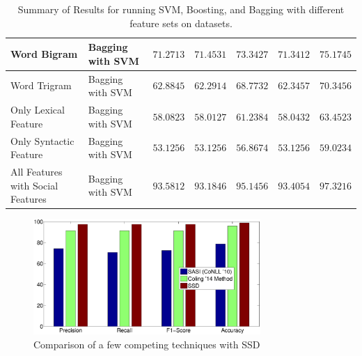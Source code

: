 \begin{table}[htb]
{\begin{tabular}{|@{~}l@{~~}|@{~~}l@{~}|@{~~}l@{~}|@{~~}l@{~}|@{~~}l@{~}|@{~~}l@{~}|@{~~}l@{~}|}
Word Bigram & Bagging with SVM & $71.2713$ & $71.4531$ & $73.3427$ & $71.3412$  & $75.1745$ \\\hline
Word Trigram & Bagging with SVM & $62.8845$ & $62.2914$ & $68.7732$ & $62.3457$ & $70.3456$ \\\hline
Only Lexical Feature & Bagging with SVM  & $58.0823$ & $58.0127$ & $61.2384$ & $58.0432$  & $63.4523$  \\\hline
Only Syntactic Feature & Bagging with SVM  & $53.1256$ & $53.1256$ & $56.8674$ & $53.1256$  & $59.0234$ \\\hline
All Features with Social Features & Bagging with SVM & $\mathbf{93.5812}$ & $\mathbf{93.1846}$ & $\mathbf{95.1456}$ & $\mathbf{93.4054}$  & $\mathbf{97.3216}$ \\\hline
\end{tabular}
  }
 \vspace{0.05in}
  \caption{Summary of Results for running SVM, Boosting, and Bagging with different feature sets on datasets.}
  \label{tab:data1}
\end{table}

\begin{figure}[hbt]
\centering
\includegraphics[width=3.4in, height= 2.4 in]{./figs/compare_systems.eps}
\caption{Comparison of a few competing techniques with SSD}
\label{train:fig}
\end{figure}

